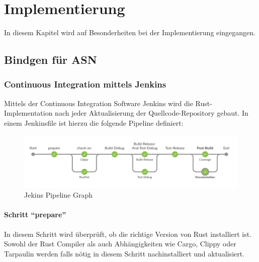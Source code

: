 
\chapter{Implementierung}

In diesem Kapitel wird auf Besonderheiten bei der Implementierung eingegangen.





\section{Bindgen für ASN}

\label{impl:issue:ffi}




\subsection{Continuous Integration mittels Jenkins}

Mittels der Continuous Integration Software Jenkins wird die Rust-Implementation nach jeder Aktualisierung der Quellcode-Repository gebaut.
In einem Jenkinsfile ist hierzu die folgende Pipeline definiert:

\begin{figure}[H]
	\includegraphics[width=\textwidth]{images/jenkins_pipeline_graph.png}
	\caption{Jekins Pipeline Graph}
	\label{impl:jenkins:pipeline:graph}
\end{figure}




\subsubsection{Schritt \enquote{prepare}}
In diesem Schritt wird überprüft, ob die richtige Version von Rust installiert ist.
Sowohl der Rust Compiler als auch Abhängigkeiten wie Cargo, Clippy oder Tarpaulin werden falls nötig  in diesem Schritt nachinstalliert und aktualisiert.


